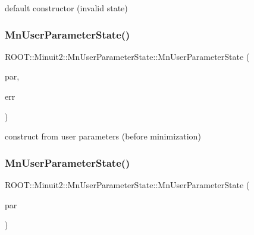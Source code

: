 default constructor (invalid state) 

\mbox{\label{classROOT_1_1Minuit2_1_1MnUserParameterState_a75f83d5752afc69f1e55838f8446880a}} 
\subsubsection{\texorpdfstring{MnUserParameterState()}{MnUserParameterState()}\hspace{0.1cm}{\footnotesize\ttfamily [2/24]}}
{\footnotesize\ttfamily R\+O\+O\+T\+::\+Minuit2\+::\+Mn\+User\+Parameter\+State\+::\+Mn\+User\+Parameter\+State (\begin{DoxyParamCaption}\item[{const std\+::vector$<$ double $>$ \&}]{par,  }\item[{const std\+::vector$<$ double $>$ \&}]{err }\end{DoxyParamCaption})}



construct from user parameters (before minimization) 

\mbox{\label{classROOT_1_1Minuit2_1_1MnUserParameterState_aa4a32c2e51a89c2feca7a376972f1ff5}} 
\subsubsection{\texorpdfstring{MnUserParameterState()}{MnUserParameterState()}\hspace{0.1cm}{\footnotesize\ttfamily [3/24]}}
{\footnotesize\ttfamily R\+O\+O\+T\+::\+Minuit2\+::\+Mn\+User\+Parameter\+State\+::\+Mn\+User\+Parameter\+State (\begin{DoxyParamCaption}\item[{const \mbox{\hyperlink{classROOT_1_1Minuit2_1_1MnUserParameters}{Mn\+User\+Parameters}} \&}]{par }\end{DoxyParamCaption})}

